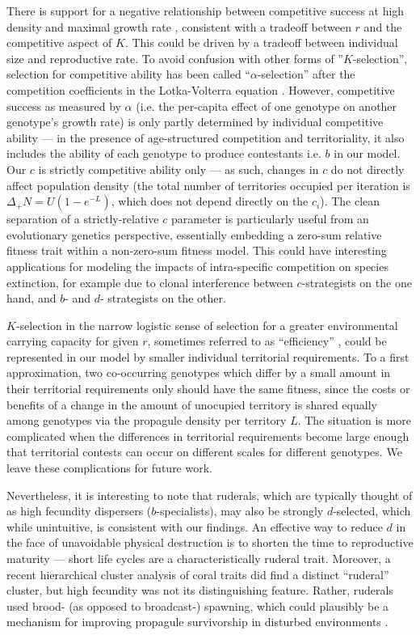 \documentclass[11pt]{article}
\begin{document}
There is support for a negative relationship between competitive success at high density and maximal growth rate \citep{luckinbill_1979}, consistent with a tradeoff between $r$ and the competitive aspect of $K$. This could be driven by a tradeoff between individual size and reproductive rate. To avoid confusion with other forms of ''$K$-selection'', selection for competitive ability has been called ``$\alpha$-selection'' after the competition coefficients in the Lotka-Volterra equation \citep{gill_1974,case_1974,joshi_2001}. However, competitive success as measured by $\alpha$ (i.e. the per-capita effect of one genotype on another genotype's growth rate) is only partly determined by individual competitive ability --- in the presence of age-structured competition and territoriality, it also includes the ability of each genotype to produce contestants i.e. $b$ in our model. Our $c$ is strictly competitive ability only --- as such, changes in $c$ do not directly affect population density (the total number of territories occupied per iteration is $\Delta_+ N=U(1-e^{-L})$, which does not depend directly on the $c_i$). The clean separation of a strictly-relative $c$ parameter is particularly useful from an evolutionary genetics perspective, essentially embedding a zero-sum relative fitness trait within a non-zero-sum fitness model. This could have interesting applications for modeling the impacts of intra-specific competition on species extinction, for example due to clonal interference \citep{gerrish_1998,desai_2007} between $c$-strategists on the one hand, and $b$- and $d$- strategists on the other.

$K$-selection in the narrow logistic sense of selection for a greater environmental carrying capacity for given $r$, sometimes referred to as ``efficiency'' \citep{macarthur_1967}, could be represented in our model by smaller individual territorial requirements. To a first approximation, two co-occurring genotypes which differ by a small amount in their territorial requirements only should have the same fitness, since the costs or benefits of a change in the amount of unocupied territory is shared equally among genotypes via the propagule density per territory $L$. The situation is more complicated when the differences in territorial requirements become large enough that territorial contests can occur on different scales for different genotypes. We leave these complications for future work. 

Nevertheless, it is interesting to note that ruderals, which are typically thought of as high fecundity dispersers ($b$-specialists), may also be strongly $d$-selected, which while unintuitive, is consistent with our findings. An effective way to reduce $d$ in the face of unavoidable physical destruction is to shorten the time to reproductive maturity --- short life cycles are a characteristically ruderal trait. Moreover, a recent hierarchical cluster analysis of coral traits did find a distinct ``ruderal'' cluster, but high fecundity was not its distinguishing feature. Rather, ruderals used brood- (as opposed to broadcast-) spawning, which could plausibly be a mechanism for improving propagule survivorship in disturbed environments \citep{darling_2012}. 
\end{document}
